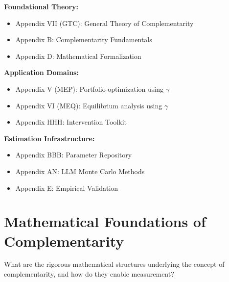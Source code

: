 \begin{tcolorbox}[colback=gray!5!white,colframe=gray!75!black,title=\textbf{Cross-Reference Map}]
\small
\textbf{Foundational Theory:}
\begin{itemize}[noitemsep]
    \item Appendix VII (GTC): General Theory of Complementarity
    \item Appendix B: Complementarity Fundamentals
    \item Appendix D: Mathematical Formalization
\end{itemize}

\textbf{Application Domains:}
\begin{itemize}[noitemsep]
    \item Appendix V (MEP): Portfolio optimization using $\gamma$
    \item Appendix VI (MEQ): Equilibrium analysis using $\gamma$
    \item Appendix HHH: Intervention Toolkit
\end{itemize}

\textbf{Estimation Infrastructure:}
\begin{itemize}[noitemsep]
    \item Appendix BBB: Parameter Repository
    \item Appendix AN: LLM Monte Carlo Methods
    \item Appendix E: Empirical Validation
\end{itemize}
\end{tcolorbox}

\section{Mathematical Foundations of Complementarity}
\label{sec:comp-math-foundations}

\begin{tcolorbox}[colback=blue!5!white,colframe=blue!75!black,title=\textbf{Fundamental Question}]
What are the rigorous mathematical structures underlying the concept of complementarity, and how do they enable measurement?
\end{tcolorbox}

